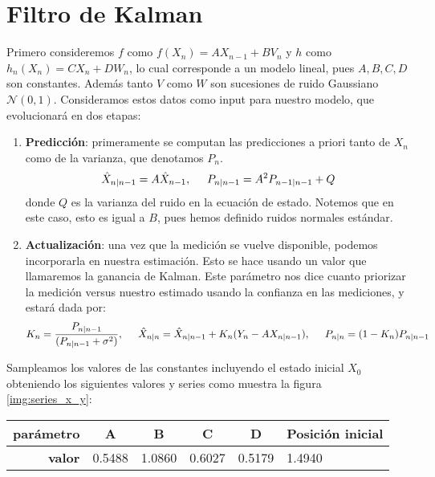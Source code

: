 \documentclass[letterpaper,11pt,oneside]{article}
\begin{document}

\section{Filtro de Kalman}

Primero consideremos $f$ como $ f(X_n) = A X_{n-1} + B V_n$ y $h$ como $ h_n(X_n) = C X_n + DW_n$, lo cual corresponde a un modelo lineal, pues $A,B,C,D$ son constantes. Además tanto $V$ como $W$ son sucesiones de ruido Gaussiano $\mathcal{N}(0,1)$. Consideramos estos datos como input para nuestro modelo, que evolucionará en dos etapas:
\begin{enumerate}
    \item \textbf{Predicción}: primeramente se computan las predicciones a priori tanto de $X_n$ como de la varianza, que denotamos $P_n$.
    $$ \hat X_{n|n-1} = A \hat X_{n-1},\hspace{.5cm} P_{n|n-1} = A^2 P_{n-1|n-1} + Q$$
    donde $Q$ es la varianza del ruido en la ecuación de estado. Notemos que en este caso, esto es igual a $B$, pues hemos definido ruidos normales estándar.
    \item \textbf{Actualización}: una vez que la medición se vuelve disponible, podemos incorporarla en nuestra estimación. Esto se hace usando un valor que llamaremos la ganancia de Kalman. Este parámetro nos dice cuanto priorizar la medición versus nuestro estimado usando la confianza en las mediciones, y estará dada por:
    $$ K_n = \frac{P_{n|n-1}}{(P_{n|n-1}+\sigma^2)},\hspace{.5cm} \hat X_{n|n}=\hat X_{n|n-1}+K_n(Y_n-AX_{n|n-1}),\hspace{.5cm} P_{n|n}=(1-K_n)P_{n|n-1}$$
\end{enumerate}


Sampleamos los valores de las constantes incluyendo el estado inicial $X_0$ obteniendo los siguientes valores y series como muestra la figura \ref{img:series_x_y}:

\begin{table}
\begin{tabular}{|c|c|c|l|l|l|}
\hline
\textbf{parámetro}                   & \textbf{A}                  & \textbf{B}                  & \multicolumn{1}{c|}{\textbf{C}} & \multicolumn{1}{c|}{\textbf{D}} & \multicolumn{1}{c|}{\textbf{Posición inicial}} \\ \hline
\multicolumn{1}{|r|}{\textbf{valor}} & \multicolumn{1}{r|}{0.5488} & \multicolumn{1}{r|}{1.0860} & 0.6027                          & 0.5179                          & 1.4940                                         \\ \hline
\end{tabular}
\end{table}
\end{document}
